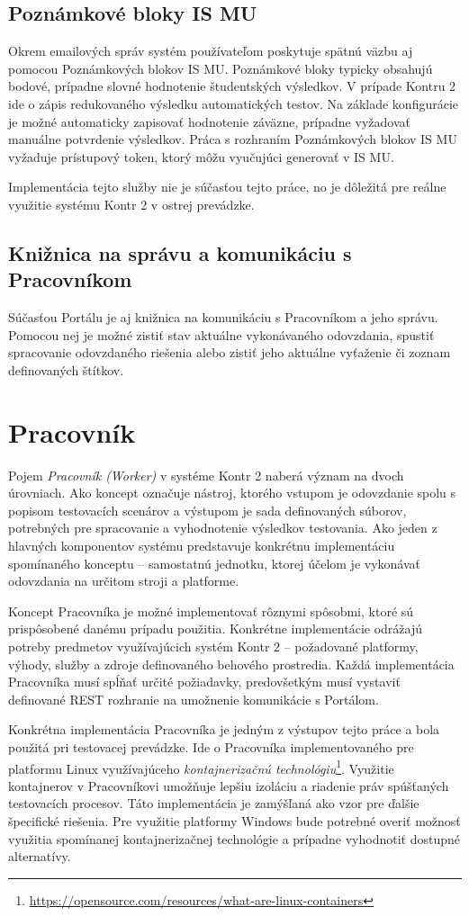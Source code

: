 \documentclass[
  digital, %
  oneside, %
  table,   %
  lof,     %
  lot,   %
]{fithesis3}
\begin{document}
\subsection{Poznámkové bloky IS MU}
Okrem emailových správ systém používateľom poskytuje spätnú väzbu aj pomocou Poznámkových blokov IS MU. Poznámkové bloky typicky obsahujú bodové, prípadne slovné hodnotenie študentských výsledkov. V prípade Kontru 2 ide o zápis redukovaného výsledku automatických testov. Na základe konfigurácie je možné automaticky zapisovať hodnotenie záväzne, prípadne vyžadovať manuálne potvrdenie výsledkov. Práca s rozhraním Poznámkových blokov IS MU vyžaduje prístupový token, ktorý môžu vyučujúci generovať v IS MU.

Implementácia tejto služby nie je súčasťou tejto práce, no je dôležitá pre reálne využitie systému Kontr 2 v ostrej prevádzke.

\subsection{Knižnica na správu a komunikáciu s Pracovníkom}
Súčasťou Portálu je aj knižnica na komunikáciu s Pracovníkom a jeho správu. Pomocou nej je možné zistiť stav aktuálne vykonávaného odovzdania, spustiť spracovanie odovzdaného riešenia alebo zistiť jeho aktuálne vyťaženie či zoznam definovaných štítkov.

\section{Pracovník}
Pojem \emph{Pracovník (Worker)} v systéme Kontr 2 naberá význam na dvoch úrovniach. Ako koncept označuje nástroj, ktorého vstupom je odovzdanie spolu s popisom testovacích scenárov a výstupom je sada definovaných súborov, potrebných pre spracovanie a vyhodnotenie výsledkov testovania. Ako jeden z hlavných komponentov systému predstavuje konkrétnu implementáciu spomínaného konceptu -- samostatnú jednotku, ktorej účelom je vykonávať odovzdania na určitom stroji a platforme. 

Koncept Pracovníka je možné implementovať rôznymi spôsobmi, ktoré sú prispôsobené danému prípadu použitia. Konkrétne implementácie odrážajú potreby predmetov využívajúcich systém Kontr 2 -- požadované platformy, výhody, služby a zdroje definovaného behového prostredia. Každá implementácia Pracovníka musí spĺňať určité požiadavky, predovšetkým musí vystaviť definované REST rozhranie na umožnenie komunikácie s Portálom. 

Konkrétna implementácia Pracovníka je jedným z výstupov tejto práce a bola použitá pri testovacej prevádzke. Ide o Pracovníka implementovaného pre platformu Linux využívajúceho \emph{kontajnerizačnú technológiu}\footnote{\url{https://opensource.com/resources/what-are-linux-containers}}. Využitie kontajnerov v Pracovníkovi umožňuje lepšiu izoláciu a riadenie práv spúšťaných testovacích procesov. Táto implementácia je zamýšľaná ako vzor pre ďalšie špecifické riešenia. Pre využitie platformy Windows bude potrebné overiť možnosť využitia spomínanej kontajnerizačnej technológie a prípadne vyhodnotiť dostupné alternatívy.
\end{document}
